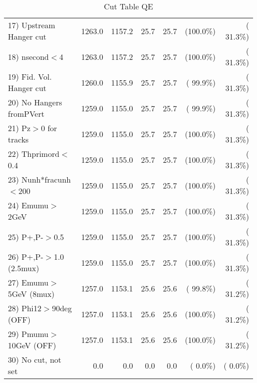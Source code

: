 \begin{table}[h!]
\begin{tabular}{||l||r|r|r|r|r|r||}
 17) Upstream Hanger cut  &       1263.0 &       1157.2 &         25.7 &         25.7 & (100.0\%) & ( 31.3\%) \\
 18) nsecond$<$4          &       1263.0 &       1157.2 &         25.7 &         25.7 & (100.0\%) & ( 31.3\%) \\
 19) Fid. Vol. Hanger cut &       1260.0 &       1155.9 &         25.7 &         25.7 & ( 99.9\%) & ( 31.3\%) \\
 20) No Hangers fromPVert &       1259.0 &       1155.0 &         25.7 &         25.7 & ( 99.9\%) & ( 31.3\%) \\
 21) Pz$>$0 for tracks    &       1259.0 &       1155.0 &         25.7 &         25.7 & (100.0\%) & ( 31.3\%) \\
 22) Thprimord$<$0.4      &       1259.0 &       1155.0 &         25.7 &         25.7 & (100.0\%) & ( 31.3\%) \\
 23) Nunh*fracunh$<$200   &       1259.0 &       1155.0 &         25.7 &         25.7 & (100.0\%) & ( 31.3\%) \\
 24) Emumu$>$2GeV         &       1259.0 &       1155.0 &         25.7 &         25.7 & (100.0\%) & ( 31.3\%) \\
 25) P+,P-$>$0.5          &       1259.0 &       1155.0 &         25.7 &         25.7 & (100.0\%) & ( 31.3\%) \\
 26) P+,P-$>$1.0 (2.5mux) &       1259.0 &       1155.0 &         25.7 &         25.7 & (100.0\%) & ( 31.3\%) \\
 27) Emumu$>$5GeV  (8mux) &       1257.0 &       1153.1 &         25.6 &         25.6 & ( 99.8\%) & ( 31.2\%) \\
 28) Phi12$>$90deg  (OFF) &       1257.0 &       1153.1 &         25.6 &         25.6 & (100.0\%) & ( 31.2\%) \\
 29) Pmumu$>$10GeV  (OFF) &       1257.0 &       1153.1 &         25.6 &         25.6 & (100.0\%) & ( 31.2\%) \\
 30) No cut, not set      &          0.0 &          0.0 &          0.0 &          0.0 & (  0.0\%) & (  0.0\%) \\
 \hline
 \hline
 \end{tabular}
 \caption{Cut Table  QE       }
 \label{tab-cutheavy_neutrino_0.250}
 \end{table}
